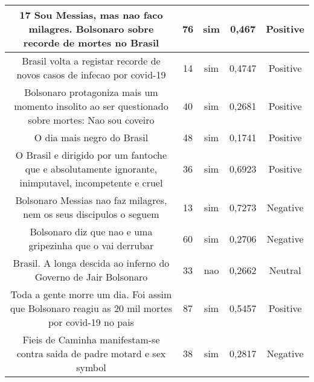 \documentclass[11pt]{article}
\newlength\mylength
\begin{document}
\begin{center}
\begin{longtable}{||C{.40\mylength}||C{.20\mylength}||C{.20\mylength}||C{.30\mylength}||C{.20\mylength}||}
   17%
   Sou Messias, mas nao faco milagres. Bolsonaro sobre recorde de mortes no Brasil  & 76 & sim & 0,467 & Positive \\  \hline
   Brasil volta a registar recorde de novos casos de infecao por covid-19  & 14 & sim & 0,4747 & Positive \\  \hline
   Bolsonaro protagoniza mais um momento insolito ao ser questionado sobre mortes: Nao sou coveiro & 40 & sim & 0,2681 & Positive \\  \hline
   O dia mais negro do Brasil  & 48 & sim & 0,1741 & Positive \\  \hline
   O Brasil e dirigido por um fantoche que e absolutamente ignorante, inimputavel, incompetente e cruel  & 36 & sim & 0,6923 & Positive \\  \hline
   Bolsonaro Messias nao faz milagres, nem os seus discipulos o seguem  & 13 & sim & 0,7273 & Negative \\  \hline
   Bolsonaro diz que nao e uma gripezinha que o vai derrubar  & 60 & sim & 0,2706 & Negative \\  \hline
   Brasil. A longa descida ao inferno do Governo  de Jair Bolsonaro  & 33 & nao & 0,2662 & Neutral \\  \hline
   Toda a gente morre um dia. Foi assim que Bolsonaro reagiu as 20 mil mortes por covid-19 no pais  & 87 & sim & 0,5457 & Positive \\  \hline
   Fieis de Caminha manifestam-se contra saida de padre motard e sex symbol & 38 & sim & 0,2817 & Negative \\  \hline

\end{longtable}
\end{center}
\end{document}
